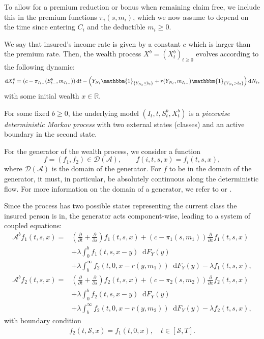 \documentclass[a4paper]{scrartcl}
\theoremstyle{remark}
\theoremstyle{definition}
\numberwithin{equation}{section}
\newcommand*\diff{\mathop{}\!\mathrm{d}}
\newcommand{\ind}{\mathbbm{1}_}
\begin{document}
To allow for a premium reduction or bonus when remaining claim free, we include this in the premium functions $\pi_i(s,m_i)$, which we now assume to depend on the time since entering $C_i$ and the deductible $m_i \geq 0$. %

We say that insured's income rate is given by a constant $c$ which is larger than the premium rate. Then, the wealth process $X^b=(X_t^b)_{t\geq0}$ evolves according to the following dynamic:
\begin{equation*}
     \diff X^b_t= (c-\pi_{I_{t-}}(S_{t-}^b,m_{I_{t-}}))\diff t - \left(Y_{N_t} \ind{\{Y_{N_t} \leq b_t\}}+ r(Y_{N_t},m_{I_{t-}}) \ind{\{Y_{N_t} > b_t\}}\right) \diff N_t,
     \end{equation*}
with some initial wealth $x \in \mathbb{R}$. 

For some fixed $b \geq 0$, the underlying model $(I_t,t,S_t^b,X_t^b)$ is a \textit{piecewise deterministic Markov process} with two external states (classes) and an active boundary in the second state.

For the generator of the wealth process, we consider a function 
\begin{equation*}
    f = (f_1,f_2) \in \mathcal{D}(\mathcal{A}), \qquad f(i,t,s,x)=f_i(t,s,x),
\end{equation*} where $\mathcal{D}(\mathcal{A})$ is the domain of the generator. For $f$ to be in the domain of the generator, it must, in particular, be absolutely continuous along the deterministic flow. For more information on the domain of a generator, we refer to \citep{Davis} or \citep{Rolski}. 

Since the process has two possible states representing the current class the insured person is in, the generator acts component-wise, leading to a system of coupled equations:
\begin{align*}
    \mathcal{A}^b f_1(t,s,x)= &\left(\frac{\partial}{\partial t}+\frac{\partial}{\partial s}\right) f_1(t,s,x)+\left(c-\pi_1(s,m_1)\right)\frac{\partial}{\partial x}f_1(t,s,x) \nonumber \\
    &+ \lambda \int_{0}^{b}f_1(t,s,x-y)\diff F_Y(y) \nonumber \\
    &+ \lambda \int_{b}^{\infty}f_2(t,0,x-r(y,m_1))\diff F_Y(y) - \lambda f_1(t,s,x),\\
    \mathcal{A}^bf_2(t,s,x) = &\left(\frac{\partial}{\partial t}+\frac{\partial}{\partial s}\right) f_2(t,s,x)+\left(c-\pi_2(s,m_2)\right)\frac{\partial}{\partial x}f_2(t,s,x) \nonumber \\
     &+ \lambda \int_{0}^{b}f_2(t,s,x-y)\diff F_Y(y)  \nonumber \\
     &+ \lambda \int_{b}^{\infty}f_2(t,0,x-r(y,m_2))\diff F_Y(y)- \lambda f_2(t,s,x),
\end{align*}
with boundary condition
\begin{align*}
    f_2(t,\mathcal{S},x)=f_1(t,0,x), \quad t \in [\mathcal{S},T].
\end{align*}
\end{document}
